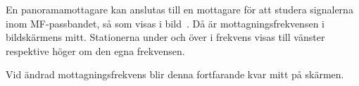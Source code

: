 En panoramamottagare kan anslutas till en mottagare för att studera
signalerna inom MF-passbandet, så som visas i bild~.
Då är mottagningsfrekvensen i bildskärmens mitt.
Stationerna under och över i frekvens visas till vänster respektive höger
om den egna frekvensen.

Vid ändrad mottagningsfrekvens blir denna fortfarande kvar mitt på skärmen.


